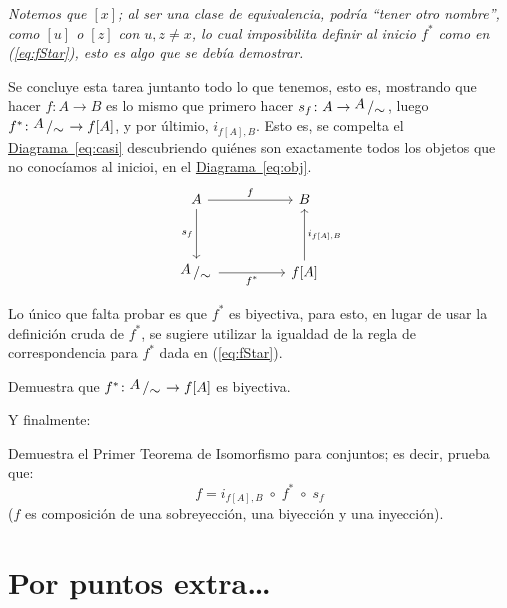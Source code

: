 \documentclass[letterpaper,DIV=14,headsepline,12pt]{scrartcl}
\newcommand{\pts}{}
\newenvironment{ejercicio}[1]{\ifthenelse{\equal{#1}{1} \OR
\equal{#1}{+1}}{\renewcommand{\pts}{\textbf{(#1
pt)}}}{\renewcommand{\pts}{\textbf{(#1 pts)}}}\begin{ejj}\upshape
\pts}{\end{ejj}}
\newcommand{\quot}[2]{{\raisebox{.2em}{$#1$}\left/\raisebox{-.2em}{$#2$}\right.}}
\begin{document}
    \textit{Notemos que $[x]$; al ser una clase de equivalencia, podría ``tener
    otro nombre'', como $[u]$ o $[z]$ con $u,z \neq x$, lo cual imposibilita
    definir al inicio $f^*$ como en (\ref{eq:fStar}), esto es algo que se debía
    demostrar.}

    Se concluye esta tarea juntanto todo lo que tenemos, esto es, mostrando que
    hacer $f\colon A\to B$ es lo mismo que primero hacer $s_f\colon A\to \quot{A}{\sim}$,
    luego $f^*\colon \quot{A}{\sim} \to f[A]$, y por últimio, $i_{f[A],B}$. Esto es,
    se compelta el \hyperref[eq:obj]{Diagrama~\ref*{eq:casi}} descubriendo
    quiénes son exactamente todos los objetos que no conocíamos al inicioi, en
    el \hyperref[eq:obj]{Diagrama~\ref*{eq:obj}}.
    \begin{equation}\label{eq:ya}
        \begin{tikzcd}
            A && B \\
            \\
            \quot{A}{\sim} && {f[A]}
            \arrow["f", from=1-1, to=1-3]
            \arrow["s_f"', from=1-1, to=3-1]
            \arrow["f^*"', from=3-1, to=3-3]
            \arrow["{i_{f[A],B}}"', from=3-3, to=1-3]
        \end{tikzcd}
    \end{equation}

    Lo único que falta probar es que $f^*$ es biyectiva, para esto, en lugar de
    usar la definición cruda de $f^*$, se sugiere utilizar la igualdad de la
    regla de correspondencia para $f^*$ dada en (\ref{eq:fStar}).

    \begin{ejercicio}{1}
        Demuestra que $f^*\colon \quot{A}{\sim} \to f[A]$ es biyectiva.
    \end{ejercicio}

    Y finalmente:
    \begin{ejercicio}{.5}
        Demuestra el Primer Teorema de Isomorfismo para conjuntos; es decir,
        prueba que:
        \[ f=i_{f[A],B} \; \circ \; f^* \; \circ \; s_f \] ($f$ es composición
        de una sobreyección, una biyección y una inyección).
    \end{ejercicio}

    \section*{Por puntos extra\dots}
\end{document}
